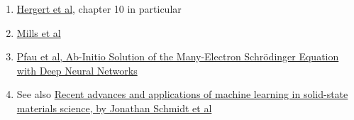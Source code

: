 \documentclass[%
oneside,                 %
final,                   %
10pt]{article}
\begin{document}
\begin{enumerate}
\item \href{{https://www.springer.com/gp/book/9783319533353}}{Hergert et al}, chapter 10 in particular

\item \href{{https://journals.aps.org/pra/abstract/10.1103/PhysRevA.96.042113}}{Mills et al} 

\item \href{{https://arxiv.org/abs/1909.02487}}{Pfau et al, Ab-Initio Solution of the Many-Electron Schrödinger Equation with Deep Neural Networks}

\item See also \href{{https://www.nature.com/articles/s41524-019-0221-0}}{Recent advances and applications of machine learning in solid-state materials science, by  Jonathan Schmidt et al}
\end{enumerate}

\noindent

\end{document}
